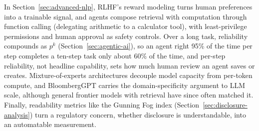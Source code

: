 \documentclass[../ai_in_finance]{subfiles}
\begin{document}
In Section~\ref{sec:advanced-nlp}, RLHF's reward modeling turns human preferences into a trainable signal, and agents compose retrieval with computation through function calling
(delegating arithmetic to a calculator tool), with least-privilege permissions and human approval as safety controls. Over a long task, reliability compounds as $p^k$ (Section~\ref{sec:agentic-ai}), so an agent right 95\% of the time per step completes a ten-step task only about 60\% of the time, and per-step reliability, not headline capability, sets how much human review an agent saves or creates. Mixture-of-experts architectures decouple model
capacity from per-token compute, and BloombergGPT carries the domain-specificity argument to LLM scale, although general frontier models with retrieval have since often matched it. Finally, readability metrics like the Gunning Fog index (Section~\ref{sec:disclosure-analysis}) turn a regulatory concern, whether disclosure
  is understandable, into an automatable measurement.

\end{document}
